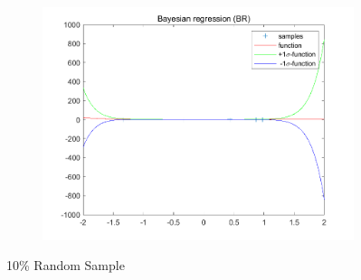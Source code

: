 \documentclass{article}
\begin{document}
\begin{figure}
\begin{subfigure}[b]{0.475\textwidth}
            \includegraphics[width=\textwidth]{fig/1c-10-br.png} 
        \end{subfigure}
        \caption{10\% Random Sample}
\end{figure}
\end{document}
